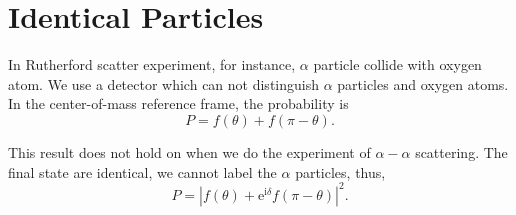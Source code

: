 \section[全同粒子]{Identical Particles}
In Rutherford scatter experiment, for instance, $\alpha$ particle collide with oxygen atom. We use a detector which can not distinguish $\alpha$ particles and oxygen atoms. In the center-of-mass reference frame, the probability is
\begin{equation}
  P = f(\theta) + f(\pi -\theta).
\end{equation}

This result does not hold on when we do the experiment of $\alpha-\alpha$ scattering. The final state are identical, we cannot label the $\alpha$ particles, thus,
\begin{equation}
  P = \left| f(\theta) + \mathrm{e}^{\mathrm{i} \delta} f(\pi - \theta) \right| ^2.
\end{equation}
